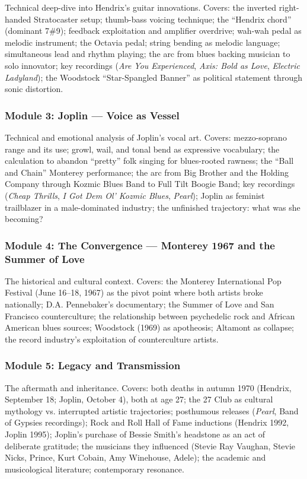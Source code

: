 \documentclass[11pt,letterpaper]{article}
\begin{document}
Technical deep-dive into Hendrix's guitar innovations. Covers: the inverted right-handed Stratocaster setup; thumb-bass voicing technique; the ``Hendrix chord'' (dominant 7\#9); feedback exploitation and amplifier overdrive; wah-wah pedal as melodic instrument; the Octavia pedal; string bending as melodic language; simultaneous lead and rhythm playing; the arc from blues backing musician to solo innovator; key recordings (\textit{Are You Experienced}, \textit{Axis: Bold as Love}, \textit{Electric Ladyland}); the Woodstock ``Star-Spangled Banner'' as political statement through sonic distortion.

\subsubsection{Module 3: Joplin --- Voice as Vessel}

Technical and emotional analysis of Joplin's vocal art. Covers: mezzo-soprano range and its use; growl, wail, and tonal bend as expressive vocabulary; the calculation to abandon ``pretty'' folk singing for blues-rooted rawness; the ``Ball and Chain'' Monterey performance; the arc from Big Brother and the Holding Company through Kozmic Blues Band to Full Tilt Boogie Band; key recordings (\textit{Cheap Thrills}, \textit{I Got Dem Ol' Kozmic Blues}, \textit{Pearl}); Joplin as feminist trailblazer in a male-dominated industry; the unfinished trajectory: what was she becoming?

\subsubsection{Module 4: The Convergence --- Monterey 1967 and the Summer of Love}

The historical and cultural context. Covers: the Monterey International Pop Festival (June 16--18, 1967) as the pivot point where both artists broke nationally; D.A. Pennebaker's documentary; the Summer of Love and San Francisco counterculture; the relationship between psychedelic rock and African American blues sources; Woodstock (1969) as apotheosis; Altamont as collapse; the record industry's exploitation of counterculture artists.

\subsubsection{Module 5: Legacy and Transmission}

The aftermath and inheritance. Covers: both deaths in autumn 1970 (Hendrix, September 18; Joplin, October 4), both at age 27; the 27 Club as cultural mythology vs. interrupted artistic trajectories; posthumous releases (\textit{Pearl}, Band of Gypsies recordings); Rock and Roll Hall of Fame inductions (Hendrix 1992, Joplin 1995); Joplin's purchase of Bessie Smith's headstone as an act of deliberate gratitude; the musicians they influenced (Stevie Ray Vaughan, Stevie Nicks, Prince, Kurt Cobain, Amy Winehouse, Adele); the academic and musicological literature; contemporary resonance.
\end{document}
